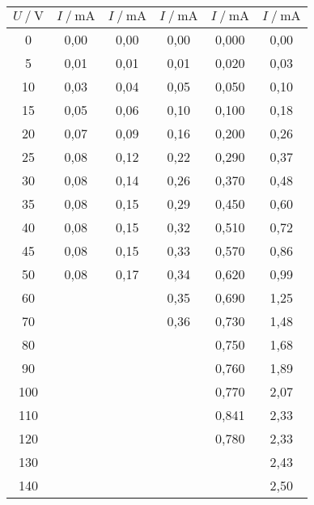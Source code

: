 \begin{table}
\begin{tabular}{c c c c c c}
    $U \mathbin{/} \unit{\volt}$ &
    $I \mathbin{/} \unit{\milli\ampere}$ &
    $I \mathbin{/} \unit{\milli\ampere}$ &
    $I \mathbin{/} \unit{\milli\ampere}$ & 
    $I \mathbin{/} \unit{\milli\ampere}$ &
    $I \mathbin{/} \unit{\milli\ampere}$ \\
    \midrule
    0   &  0,00 &    0,00 &    0,00 &   0,000 &    0,00 \\
    5   &  0,01 &    0,01 &    0,01 &   0,020 &    0,03 \\
    10  &  0,03 &    0,04 &    0,05 &   0,050 &    0,10 \\
    15  &  0,05 &    0,06 &    0,10 &   0,100 &    0,18 \\
    20  &  0,07 &    0,09 &    0,16 &   0,200 &    0,26 \\
    25  &  0,08 &    0,12 &    0,22 &   0,290 &    0,37 \\
    30  &  0,08 &    0,14 &    0,26 &   0,370 &    0,48 \\
    35  &  0,08 &    0,15 &    0,29 &   0,450 &    0,60 \\
    40  &  0,08 &    0,15 &    0,32 &   0,510 &    0,72 \\
    45  &  0,08 &    0,15 &    0,33 &   0,570 &    0,86 \\
    50  &  0,08 &    0,17 &    0,34 &   0,620 &    0,99 \\
    60  &       &         &    0,35 &   0,690 &    1,25 \\
    70  &       &         &    0,36 &   0,730 &    1,48 \\
    80  &       &         &         &   0,750 &    1,68 \\
    90  &       &         &         &   0,760 &    1,89 \\
    100 &       &         &         &   0,770 &    2,07 \\
    110 &       &         &         &   0,841 &    2,33 \\
    120 &       &         &         &   0,780 &    2,33 \\
    130 &       &         &         &         &    2,43 \\
    140 &       &         &         &         &    2,50 \\
  \bottomrule
  \end{tabular}
\end{table}

